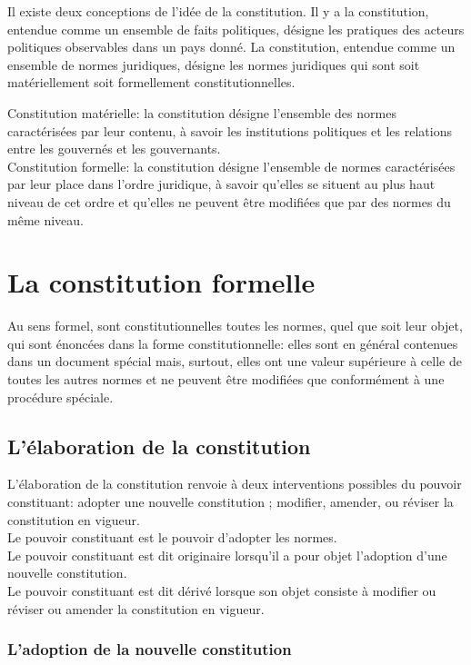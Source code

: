 \documentclass[12pt, a4paper, openany]{book}
\begin{document}
Il existe deux conceptions de l'idée de la constitution. Il y a la constitution, entendue comme un ensemble de faits politiques, désigne les pratiques des acteurs politiques observables dans un pays donné. La constitution, entendue comme un ensemble de normes juridiques, désigne les normes juridiques qui sont soit matériellement soit formellement constitutionnelles.


Constitution matérielle: la constitution désigne l'ensemble des normes caractérisées par leur contenu, à savoir les institutions politiques et les relations entre les gouvernés et les gouvernants. \\
Constitution formelle: la constitution désigne l'ensemble de normes caractérisées par leur place dans l'ordre juridique, à savoir qu'elles se situent au plus haut niveau de cet ordre et qu'elles ne peuvent être modifiées que par des normes du même niveau.


\chapter{La constitution formelle}

Au sens formel, sont constitutionnelles toutes les normes, quel que soit leur objet, qui sont énoncées dans la forme constitutionnelle: elles sont en général contenues dans un document spécial mais, surtout, elles ont une valeur supérieure à celle de toutes les autres normes et ne peuvent être modifiées que conformément à une procédure spéciale.

\section{L'élaboration de la constitution}

L'élaboration de la constitution renvoie à deux interventions possibles du pouvoir constituant: adopter une nouvelle constitution ; modifier, amender, ou réviser la constitution en vigueur. \\
Le pouvoir constituant est le pouvoir d'adopter les normes. \\
Le pouvoir constituant est dit originaire lorsqu'il a pour objet l'adoption d'une nouvelle constitution. \\
Le pouvoir constituant est dit dérivé lorsque son objet consiste à modifier ou réviser ou amender la constitution en vigueur. 

\subsection{L'adoption de la nouvelle constitution}
\end{document}
